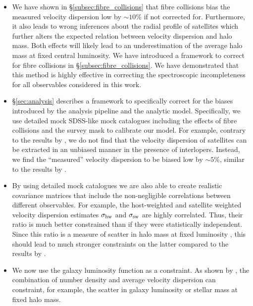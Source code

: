 \documentclass[fleqn,usenatbib,useAMS]{mnras}
\begin{document}
	\begin{itemize}
		
		\item We have shown in \S\ref{subsec:fibre_collisions} that fibre collisions bias the measured velocity dispersion low by $\sim 10\%$ if not corrected for. Furthermore, it also leads to wrong inferences about the radial profile of satellites which further alters the expected relation between velocity dispersion and halo mass. Both effects will likely lead to an underestimation of the average halo mass at fixed central luminosity. We have introduced a framework to correct for fibre collisions in \S\ref{subsec:fibre_collisions}. We have demonstrated that this method is highly effective in correcting the spectroscopic incompleteness for all observables considered in this work.
		
		\item \S\ref{sec:analysis} describes a framework to specifically correct for the biases introduced by the analysis pipeline and the analytic model. Specifically, we use detailed mock SDSS-like mock catalogues including the effects of fibre collisions and the survey mask to calibrate our model. For example, contrary to the results by \cite{More+09b}, we do not find that the velocity dispersion of satellites can be extracted in an unbiased manner in the presence of interlopers. Instead, we find the ``measured'' velocity dispersion to be biased low by $\sim 5\%$, similar to the results by \cite{Becker+07}.
		
		\item By using detailed mock catalogues we are also able to create realistic covariance matrices that include the non-negligible correlations between different observables. For example, the host-weighted and satellite weighted velocity dispersion estimates $\sigma_{\rm hw}$ and $\sigma_{\rm sw}$ are highly correlated. Thus, their ratio is much better constrained than if they were statistically independent. Since this ratio is a measure of scatter in halo mass at fixed luminosity \citep{More+09a}, this should lead to much stronger constraints on the latter compared to the results by \cite{More+09b, More+11}.
		
		\item We now use the galaxy luminosity function as a constraint. As shown by \cite{Li+12}, the combination of number density and average velocity dispersion can constraint, for example, the scatter in galaxy luminosity or stellar mass at fixed halo mass.
		
	\end{itemize}
	
\end{document}
